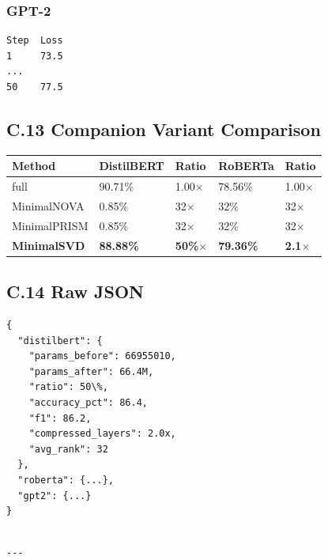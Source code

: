 \subsubsection{GPT-2}
\begin{lstlisting}
Step  Loss
1     73.5
...
50    77.5
\end{lstlisting}

\subsection{C.13 Companion Variant Comparison}

\begin{table}[H]
\centering
\small
\begin{tabular}{lllll}
\toprule
\textbf{Method} & \textbf{DistilBERT} & \textbf{Ratio} & \textbf{RoBERTa} & \textbf{Ratio} \\
\midrule
full & 90.71\% & 1.00$\times$ & 78.56\% & 1.00$\times$ \\
MinimalNOVA & 0.85\% & 32$\times$ & 32\% & 32$\times$ \\
MinimalPRISM & 0.85\% & 32$\times$ & 32\% & 32$\times$ \\
\textbf{MinimalSVD} & \textbf{88.88\%} & \textbf{50\%$\times$} & \textbf{79.36\%} & \textbf{2.1$\times$} \\
\bottomrule
\end{tabular}
\end{table}

\subsection{C.14 Raw JSON}

\begin{lstlisting}
{
  "distilbert": {
    "params_before": 66955010,
    "params_after": 66.4M,
    "ratio": 50\%,
    "accuracy_pct": 86.4,
    "f1": 86.2,
    "compressed_layers": 2.0x,
    "avg_rank": 32
  },
  "roberta": {...},
  "gpt2": {...}
}
\end{lstlisting}
\begin{lstlisting}

---
\end{lstlisting}